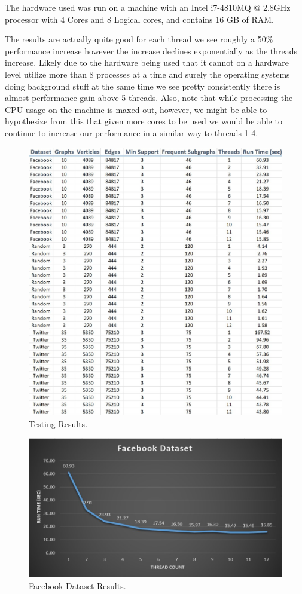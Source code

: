 \documentclass{article}
\begin{document}
The hardware used was run on a machine with an Intel i7-4810MQ @ 2.8GHz processor with 4 Cores and 8 Logical cores, and contains 16 GB of RAM.

The results are actually quite good for each thread we see roughly a 50\% performance increase however the increase declines exponentially as the threads increase. Likely due to the hardware being used that it cannot on a hardware level utilize more than 8 processes at a time and surely the operating systems doing background stuff at the same time we see pretty consistently there is almost performance gain above 5 threads. Also, note that while processing the CPU usage on the machine is maxed out, however, we might be able to hypothesize from this that given more cores to be used we would be able to continue to increase our performance in a similar way to threads 1-4.

\begin{figure}
  \includegraphics[width=\linewidth]{Figure6.jpg}
  \caption{Testing Results.}
  \label{fig:Testing}
\end{figure}

\begin{figure}
  \includegraphics[width=\linewidth]{Figure7.jpg}
  \caption{Facebook Dataset Results.}
  \label{fig:Facebook}
\end{figure}
\end{document}
